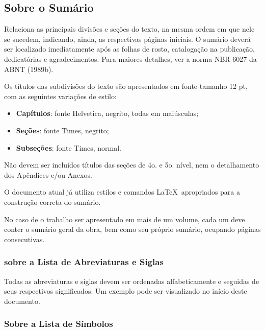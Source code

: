 \documentclass[rel_mlp]{iiufrgs}
\begin{document}
\subsection{Sobre o Sumário}

Relaciona as principais divisões e seções do texto, na mesma ordem em que nele se sucedem, indicando, ainda, as respectivas páginas iniciais. O sumário deverá ser localizado imediatamente após as folhas de rosto, catalogação na publicação, dedicatórias e agradecimentos. Para maiores detalhes, ver a norma NBR-6027 da ABNT (1989b). 


Os títulos das subdivisões do texto são apresentados em fonte tamanho 12 pt, com as seguintes variações de estilo: 

\begin{itemize}[leftmargin=3em] %

\setlength{\itemindent}{1em}

    \item \textbf{Capítulos}: fonte Helvetica, negrito, todas em maiúsculas;

    \item \textbf{Seções}: fonte Times, negrito;

    \item \textbf{Subseções}: fonte Times, normal. 

\end{itemize}

Não devem ser incluídos títulos das seções de 4o. e 5o. nível, nem o detalhamento dos Apêndices e/ou Anexos. 

O documento atual já utiliza estilos e comandos \LaTeX\ apropriados para a construção correta do sumário. 

No caso de o trabalho ser apresentado em mais de um volume, cada um deve conter o sumário geral da obra, bem como seu próprio sumário, ocupando páginas consecutivas. 



\subsubsection{sobre a Lista de Abreviaturas e Siglas}

Todas as abreviaturas e siglas devem ser ordenadas alfabeticamente e seguidas de seus respectivos significados. Um exemplo pode ser visualizado no início deste documento. 



\subsubsection{Sobre a Lista de Símbolos}
\end{document}
